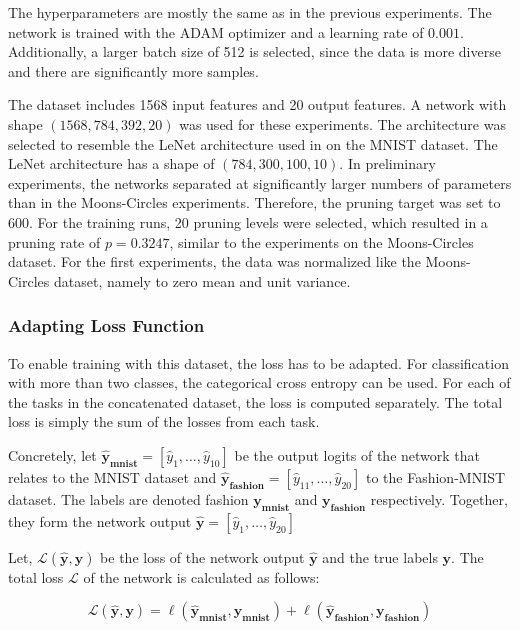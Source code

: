The hyperparameters are mostly the same as in the previous experiments.
The network is trained with the ADAM optimizer and a learning rate of $0.001$.
Additionally, a larger batch size of 512 is selected, since the data is more diverse and there are significantly more samples.

The dataset includes 1568 input features and 20 output features.
A network with shape $(1568, 784, 392, 20)$ was used for these experiments.
The architecture was selected to resemble the LeNet architecture used in \autocite{LTH} on the MNIST dataset.
The LeNet architecture has a shape of $(784, 300, 100, 10)$.
In preliminary experiments, the networks separated at significantly larger numbers of parameters than in the Moons-Circles experiments.
Therefore, the pruning target was set to 600.
For the training runs, 20 pruning levels were selected, which resulted in a pruning rate of $p=0.3247$, similar to the experiments on the Moons-Circles dataset.
For the first experiments, the data was normalized like the Moons-Circles dataset, namely to zero mean and unit variance.

\subsubsection{Adapting Loss Function}
To enable training with this dataset, the loss has to be adapted.
For classification with more than two classes, the categorical cross entropy can be used.
For each of the tasks in the concatenated dataset, the loss is computed separately.
The total loss is simply the sum of the losses from each task.

Concretely, let $\mathbf{\hat y_{mnist}} = \left[\hat y_1, \dots, \hat y_{10}\right]$ be the output logits of the network that relates to the MNIST dataset and $\mathbf{\hat y_{fashion}} = \left[\hat y_{11}, \dots, \hat y_{20}\right]$ to the Fashion-MNIST dataset.
The labels are denoted fashion $\mathbf{y_{mnist}}$ and $\mathbf{y_{fashion}}$ respectively.
Together, they form the network output $\mathbf{\hat y} = \left[\hat y_1, \dots, \hat y_{20}\right]$

Let, $\mathcal{L} (\mathbf{\hat y}, \mathbf{y})$ be the loss of the network output $\mathbf{\hat y}$ and the true labels $\mathbf{y}$.
The total loss $\mathcal{L}$ of the network is calculated as follows:

\[
\mathcal{L}  (\mathbf{\hat y}, \mathbf{y})
= \ell  (\mathbf{\hat y_{mnist}}, \mathbf{y_{mnist}})
+ \ell (\mathbf{\hat y_{fashion}}, \mathbf{y_{fashion}})
\]

